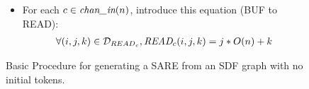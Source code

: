 \begin{figure}[t]
{\begin{minipage}{6.3in}
\begin{itemize}
\begin{align}
\mt{BUF}_{c}(i,j) = 
  \mt{WRITE}_{c}(i * \frac{\mt{Period}(c)}{O(c)} + \lfloor \frac{q}{S(n)} \rfloor, q~mod~S(n),
                     j - q * U(c) \\ \nonumber
\mt{where } {\cal D}_{SW {\small \rightarrow} SB}(c,q) = 
  {\cal D}_{{BUF}_{c}} \cap 
  \{ (i,j) | q*U(c) \le j \le (q+1)*U(c) - 1 \}
\end{align}
\item For each $c \in \mbox{\it chan\_in}(n)$, introduce this equation (BUF to
READ):
\begin{align}
\forall (i,j,k) \in {\cal D}_{{READ}_{c}},
\mbox{\it READ}_{c}(i,j,k) = j*O(n) + k
\end{align}
\end{itemize}

\end{minipage}}
\caption{Basic Procedure for generating a SARE from an SDF graph with no initial tokens.
\protect\label{fig:sdftosare}}
\end{figure}
